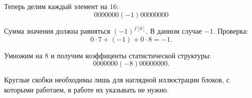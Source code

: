Теперь делим каждый элемент на $16$:
$$
0000000(-\!1)00000000
$$

Сумма значения должна равняться $(-1)^{f[0]}$. В данном случае $-1$.
Проверка:
$$
0 \cdot 7 + (-1) + 0 \cdot 8 = -1.
$$

Умножим на 8 и получим коэффиценты статистической структуры:
$$
0000000(-\!8)00000000.
$$

\prim Круглые скобки необходимы лишь для наглядной иллюстрации блоков, с которыми работаем, в работе их указывать не нужно.